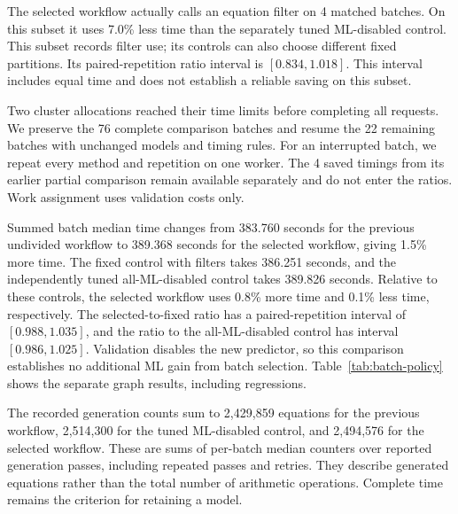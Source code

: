 The selected workflow actually calls an equation filter on 4 matched batches. On this subset it uses 7.0\% less time than the separately tuned ML-disabled control. This subset records filter use; its controls can also choose different fixed partitions. Its paired-repetition ratio interval is $[0.834, 1.018]$. This interval includes equal time and does not establish a reliable saving on this subset.


Two cluster allocations reached their time limits before completing all requests. We preserve the 76 complete comparison batches and resume the 22 remaining batches with unchanged models and timing rules. For an interrupted batch, we repeat every method and repetition on one worker. The 4 saved timings from its earlier partial comparison remain available separately and do not enter the ratios. Work assignment uses validation costs only.

Summed batch median time changes from 383.760 seconds for the previous undivided workflow to 389.368 seconds for the selected workflow, giving 1.5\% more time. The fixed control with filters takes 386.251 seconds, and the independently tuned all-ML-disabled control takes 389.826 seconds. Relative to these controls, the selected workflow uses 0.8\% more time and 0.1\% less time, respectively. The selected-to-fixed ratio has a paired-repetition interval of $[0.988, 1.035]$, and the ratio to the all-ML-disabled control has interval $[0.986, 1.025]$. Validation disables the new predictor, so this comparison establishes no additional ML gain from batch selection. Table~\ref{tab:batch-policy} shows the separate graph results, including regressions.


The recorded generation counts sum to 2,429,859 equations for the previous workflow, 2,514,300 for the tuned ML-disabled control, and 2,494,576 for the selected workflow. These are sums of per-batch median counters over reported generation passes, including repeated passes and retries. They describe generated equations rather than the total number of arithmetic operations. Complete time remains the criterion for retaining a model.

